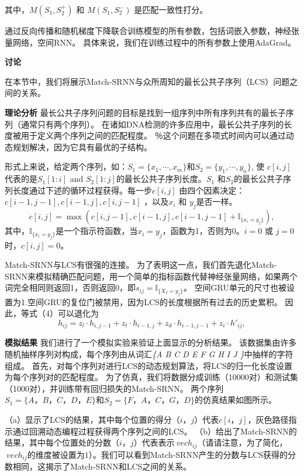 其中，$M(S_1,S_2^+)$ 和 $M(S_1,S_2^-)$ 是匹配一致性打分。

通过反向传播和随机梯度下降联合训练模型的所有参数，包括词嵌入参数，神经张量网络，空间RNN。 具体来说，我们在训练过程中的所有参数上使用AdaGrad。

\textbf{讨论}

在本节中，我们将展示Match-SRNN与众所周知的最长公共子序列（LCS）问题之间的关系。

\textbf{理论分析}
最长公共子序列问题的目标是找到一组序列中所有序列共有的最长子序列（通常只有两个序列）。 在诸如DNA检测的许多应用中，最长公共子序列的长度被用于定义两个序列之间的匹配程度。 ％这个问题在多项式时间内可以通过动态规划解决，因为它具有最优的子结构。

形式上来说，给定两个序列，如：$S_1{=}\{x_1,\cdots,x_m\}$和$S_2{=}\{y_1,\cdots,y_n\}$, 使 $c[i,j]$ 代表的是$S_1[1{:}i]$ and $S_2[1{:}j]$的最长公共子序列长度。$S_1$ 和$S_2$的最长公共子序列长度通过下述的循环过程获得。每一步$c[i,j]$ 由四个因素决定： $c[i{-}1,j{-}1],c[i{-}1,j],c[i,j{-}1]$ ，以及$x_i$ 和 $y_j$是否一样。
\begin{equation}\label{eq:LCS}
c[i,j]{=}\max(c[i,j{-}1], c[i{-}1,j],c[i{-}1,j{-}1]+\mathbb{I}_{\{x_i=y_j\}}),
\end{equation}
其中，$\mathbb{I}_{\{x_i=y_j\}}$是一个指示符函数，当$x_i=y_j$，函数为1，否则为0。$i{=}0$ 或 $j{=}0$时，$c[i,j]{=}0$。

Match-SRNN与LCS有很强的连接。 为了表明这一点，我们首先退化Match-SRNN来模拟精确匹配问题，用一个简单的指标函数代替神经张量网络，如果两个词完全相同则返回1，否则返回0，即$ s_ {ij} {=}\mathbb{I}_ {\{X_I= y_j\}}$。
空间GRU单元的尺寸也被设置为1.空间GRU的复位门被禁用，因为LCS的长度根据所有过去的历史累积。 因此，等式（4）可以退化为
\[
{h}_{ij}     ={z}_{l}\cdot{h}_{i,j-1}+{z}_{t}\cdot{h}_{i-1,j}+
            		  {z}_{d}\cdot{h}_{i-1,j-1}+{z}_{i}\cdot{h}'_{ij},
\]

\textbf{模拟结果}
我们进行了一个模拟实验来验证上面显示的分析结果。 该数据集由许多随机抽样序列对构成，每个序列由从词汇\textit {\{A B C D E F G H I J \}}中抽样的字符组成。 首先，对每个序列对进行LCS的动态规划算法，将LCS的归一化长度设置为每个序列对的匹配程度。 为了仿真，我们将数据分成训练（10000对）和测试集（1000对），并训练带有回归损失的Match-SRNN。 两个序列$ S_1 = \{A，B，C，D，E \} $和$ S_2 = \{F，A，C，G，D \} $的仿真结果如图所示。

（a）显示了LCS的结果，其中每个位置的得分$（i，j）$代表$ c [i，j] $，灰色路径指示通过回溯动态编程过程获得两个序列之间的LCS。 （b）给出了Match-SRNN的结果，其中每个位置处的分数$（i，j）$代表表示$ \ vec {h} _ {ij} $（请请注意，为了简化，$ \ vec {h} _ {ij} $的维度被设置为$ 1 $）。我们可以看到Match-SRNN产生的分数与LCS获得的分数相同，这揭示了Match-SRNN和LCS之间的关系。

